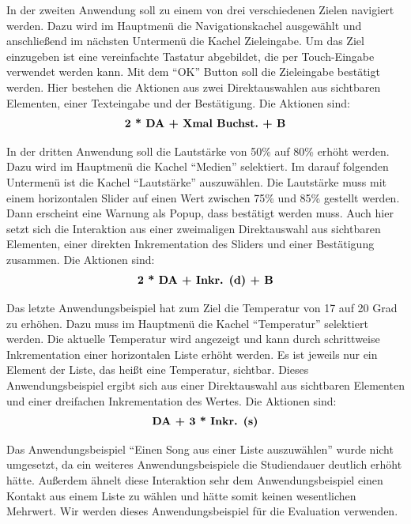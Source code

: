 In der zweiten Anwendung soll zu einem von drei verschiedenen Zielen navigiert werden. 
Dazu wird im Hauptmenü die Navigationskachel ausgewählt und anschließend im nächsten Untermenü die Kachel Zieleingabe. 
Um das Ziel einzugeben ist eine vereinfachte Tastatur abgebildet, die per Touch-Eingabe verwendet werden kann. 
Mit dem "`OK"' Button soll die Zieleingabe bestätigt werden. 
Hier bestehen die Aktionen aus zwei Direktauswahlen aus sichtbaren Elementen, einer Texteingabe und der Bestätigung. 
Die Aktionen sind:
$$\textbf{2 * \text{DA} + \text{Xmal Buchst.} + \text{B}}$$

In der dritten Anwendung soll die Lautstärke von 50\% auf 80\% erhöht werden. 
Dazu wird im Hauptmenü die Kachel "`Medien"' selektiert. 
Im darauf folgenden Untermenü ist die Kachel "`Lautstärke"' auszuwählen. 
Die Lautstärke muss mit einem horizontalen Slider auf einen Wert zwischen 75\% und 85\% gestellt werden. 
Dann erscheint eine Warnung als Popup, dass bestätigt werden muss. 
Auch hier setzt sich die Interaktion aus einer zweimaligen Direktauswahl aus sichtbaren Elementen, einer direkten Inkrementation des Sliders und einer Bestätigung zusammen.
Die Aktionen sind:
$$\textbf{2 * \text{DA} + \text{Inkr. (d)} + \text{B}}$$

Das letzte Anwendungsbeispiel hat zum Ziel die Temperatur von 17 auf 20 Grad zu erhöhen. 
Dazu muss im Hauptmenü die Kachel "`Temperatur"' selektiert werden. 
Die aktuelle Temperatur wird angezeigt und kann durch schrittweise Inkrementation einer horizontalen Liste erhöht werden.
Es ist jeweils nur ein Element der Liste, das heißt eine Temperatur, sichtbar.
Dieses Anwendungsbeispiel ergibt sich aus einer Direktauswahl aus sichtbaren Elementen und einer dreifachen Inkrementation des Wertes. 
Die Aktionen sind:
$$\textbf{\text{DA} + 3 * \text{Inkr. (s)}}$$

Das Anwendungsbeispiel "`Einen Song aus einer Liste auszuwählen"' wurde nicht umgesetzt, da ein weiteres  Anwendungsbeispiele die Studiendauer deutlich erhöht hätte. 
Außerdem ähnelt diese Interaktion sehr dem Anwendungsbeispiel einen Kontakt aus einem Liste zu wählen und hätte somit keinen wesentlichen Mehrwert. 
Wir werden dieses Anwendungsbeispiel für die Evaluation verwenden.

